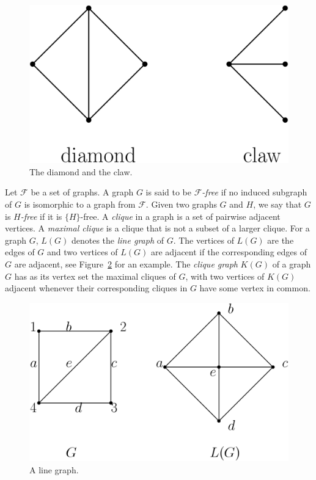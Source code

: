 \documentclass[12pt,a4paper,titlepage,openany]{report}
\begin{document}
\begin{figure}[h]
\begin{center}
\includegraphics[width=0.4\linewidth]{figures/diaclaw.png}
\end{center}
\caption{The diamond and the claw.}\label{diaclaw}
\end{figure}

Let $\mathcal{F}$ be a set of graphs. A graph $G$ is said to be \emph{$\mathcal{F}$-free} if no induced subgraph of $G$ is isomorphic to a graph from $\mathcal{F}$. Given two graphs $G$ and $H$, we say that $G$ is \emph{$H$-free} if it is $\{H\}$-free.
A \emph{clique} in a graph is a set of pairwise adjacent vertices.
A \emph{maximal clique} is a clique that is not a subset of a larger clique. For a graph $G$, $L(G)$ denotes the \emph{line graph} of $G$. The vertices of $L(G)$ are the edges of $G$ and two vertices of $L(G)$ are adjacent if the corresponding edges of $G$ are adjacent, see Figure~\ref{linegraph} for an example.
The \emph{clique graph} $K(G)$ of a graph $G$ has as its vertex set the maximal cliques of $G$, with two vertices of $K(G)$ adjacent whenever their corresponding cliques in $G$ have some vertex in common.

\begin{figure}[h]
\begin{center}
\includegraphics[width=0.7\linewidth]{figures/linegraph.png}
\end{center}
\caption{A line graph.}\label{linegraph}
\end{figure}
\medskip
\end{document}
